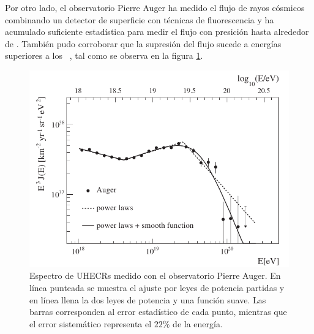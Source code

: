 Por otro lado, el observatorio Pierre Auger ha medido el flujo de rayos c\'osmicos combinando un detector de superficie con t\'ecnicas de fluorescencia y ha acumulado suficiente estad\'istica para medir el flujo con presici\'on hasta alrededor de . 
Tambi\'en pudo corroborar que la supresi\'on del flujo sucede a energ\'ias superiores a los ~\cite{cite:AugerSpectrum}, tal como se observa en la figura \ref{fig:specGZK}.
%
\begin{figure}[ht]
	\begin{center}
	\includegraphics[width=\textwidth]{fig/introduccion/spectrum_withGZK}
	\caption{\label{fig:specGZK} Espectro de UHECRs medido con el observatorio Pierre Auger. En l\'inea punteada se muestra el ajuste por leyes de potencia partidas y en l\'inea llena la dos leyes de potencia y una funci\'on suave. Las barras corresponden al error estad\'istico de cada punto, mientras que el error sistem\'atico representa el $22\%$ de la energ\'ia.}
	\end{center}
\end{figure}

